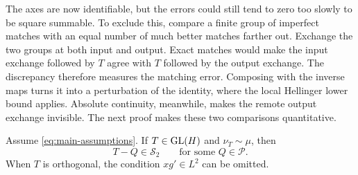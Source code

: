 The axes are now identifiable, but the errors could still tend to zero too
slowly to be square summable. To exclude this, compare a finite group of
imperfect matches with an equal number of much better matches farther out.
Exchange the two groups at both input and output. Exact matches would make
the input exchange followed by \(T\) agree with \(T\) followed by the output
exchange. The discrepancy therefore measures the matching error. Composing
with the inverse maps turns it into a perturbation of the identity, where
the local Hellinger lower bound applies. Absolute continuity, meanwhile,
makes the remote output exchange
invisible. The next proof makes these two comparisons quantitative.

\begin{lemma}
\label{lem:hilbert-schmidt-necessity}
Assume \eqref{eq:main-assumptions}.
If $T\in\operatorname{GL}(H)$ and $\nu_T\sim\mu$, then
\begin{equation}
 T-Q\in\mathcal S_2
 \qquad\text{for some }Q\in\mathcal P.
 \label{eq:hilbert-schmidt-necessity}
\end{equation}
When $T$ is orthogonal, the condition $xg'\in L^2$ can be omitted.
\end{lemma}
